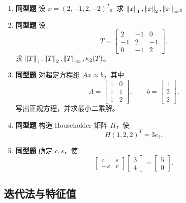 \documentclass{article}
\newcommand{\simtag}{\textcolor{blue!65!black}{\textbf{同型题}}}
\begin{document}
\begin{enumerate}
  \item \simtag{} 设 $x=(2,-1,2,-2)^T$。求
  $\left\| x \right\|_1,\left\| x \right\|_2,\left\| x \right\|_\infty$。

  \item \simtag{} 设
  \[
    T=\begin{bmatrix}
      2&-1&0\\
      -1&2&-1\\
      0&-1&2
    \end{bmatrix}.
  \]
  求 $\left\| T \right\|_1,\left\| T \right\|_2,\left\| T \right\|_\infty,\kappa_2(T)$。

  \item \simtag{} 对超定方程组 $Ax\approx b$，其中
  \[
    A=\begin{bmatrix}1&0\\1&1\\1&2\end{bmatrix},\qquad
    b=\begin{bmatrix}1\\2\\2\end{bmatrix}.
  \]
  写出正规方程，并求最小二乘解。

  \item \simtag{} 构造 Householder 矩阵 $H$，使
  \[
    H(1,2,2)^T=3e_1.
  \]

  \item \simtag{} 确定 $c,s$，使
  \[
    \begin{bmatrix}c&s\\-s&c\end{bmatrix}
    \begin{bmatrix}3\\4\end{bmatrix}
    =
    \begin{bmatrix}5\\0\end{bmatrix}.
  \]
\end{enumerate}

\subsection{迭代法与特征值}
\end{document}
